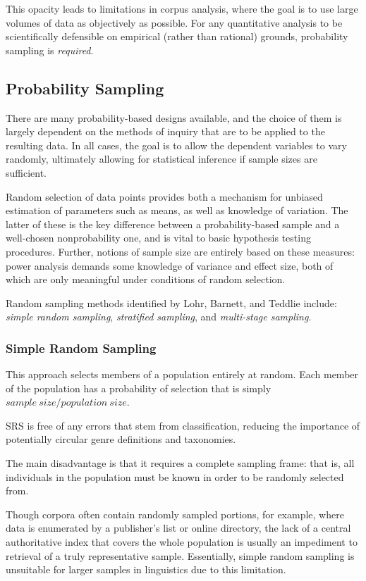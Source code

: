 This opacity leads to limitations in corpus analysis, where the goal is to use large volumes of data as objectively as possible.  For any quantitative analysis to be scientifically defensible on empirical (rather than rational) grounds, probability sampling is \textsl{required}.




\subsection{Probability Sampling}
There are many probability-based designs available, and the choice of them is largely dependent on the methods of inquiry that are to be applied to the resulting data.  In all cases, the goal is to allow the dependent variables to vary randomly, ultimately allowing for statistical inference if sample sizes are sufficient.

Random selection of data points provides both a mechanism for unbiased estimation of parameters such as means, as well as knowledge of variation.  The latter of these is the key difference between a probability-based sample and a well-chosen nonprobability one, and is vital to basic hypothesis testing procedures.  Further, notions of sample size are entirely based on these measures: power analysis demands some knowledge of variance and effect size, both of which are only meaningful under conditions of random selection.

Random sampling methods identified by Lohr, Barnett, and Teddlie include\cite{lohr2009sampling,barnett1991sample,Teddlie01012007}: \textsl{simple random sampling}, \textsl{stratified sampling}, and \textsl{multi-stage sampling}.

\subsubsection{Simple Random Sampling}
This approach selects members of a population entirely at random.  Each member of the population has a probability of selection that is simply $sample~size/population~size$.

SRS is free of any errors that stem from classification, reducing the importance of potentially circular genre definitions and taxonomies.

The main disadvantage is that it requires a complete sampling frame: that is, all individuals in the population must be known in order to be randomly selected from.

Though corpora often contain randomly sampled portions, for example, where data is enumerated by a publisher's list or online directory, the lack of a central authoritative index that covers the whole population is usually an impediment to retrieval of a truly representative sample.  Essentially, simple random sampling is unsuitable for larger samples in linguistics due to this limitation.

